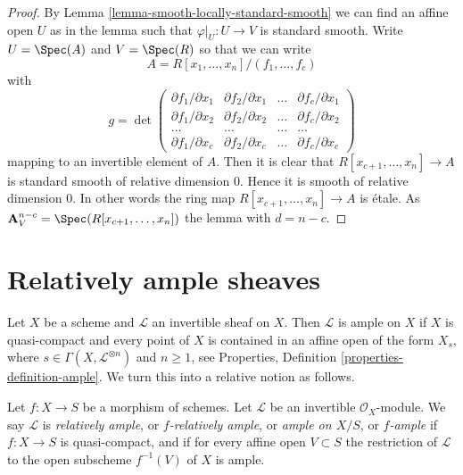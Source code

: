 \begin{proof}
By
Lemma \ref{lemma-smooth-locally-standard-smooth}
we can find an affine open $U$ as in the lemma such that
$\varphi|_U : U \to V$ is standard smooth. Write
$U = \Spec(A)$ and $V = \Spec(R)$ so that we can write
$$
A = R[x_1, \ldots, x_n]/(f_1, \ldots, f_c)
$$
with
$$
g =
\det
\left(
\begin{matrix}
\partial f_1/\partial x_1 &
\partial f_2/\partial x_1 &
\ldots &
\partial f_c/\partial x_1 \\
\partial f_1/\partial x_2 &
\partial f_2/\partial x_2 &
\ldots &
\partial f_c/\partial x_2 \\
\ldots & \ldots & \ldots & \ldots \\
\partial f_1/\partial x_c &
\partial f_2/\partial x_c &
\ldots &
\partial f_c/\partial x_c
\end{matrix}
\right)
$$
mapping to an invertible element of $A$. Then it is clear that
$R[x_{c + 1}, \ldots, x_n] \to A$ is standard smooth of relative
dimension $0$. Hence it is smooth of relative dimension $0$.
In other words the ring map $R[x_{c + 1}, \ldots, x_n] \to A$
is \'etale. As $\mathbf{A}^{n - c}_V = \Spec(R[x_{c + 1}, \ldots, x_n])$
the lemma with $d = n - c$.
\end{proof}
















\section{Relatively ample sheaves}
\label{section-relatively-ample}

\noindent
Let $X$ be a scheme and $\mathcal{L}$ an invertible sheaf on $X$.
Then $\mathcal{L}$ is ample on $X$ if $X$ is quasi-compact and
every point of $X$ is contained in an affine open of the form
$X_s$, where $s \in \Gamma(X, \mathcal{L}^{\otimes n})$ and $n \geq 1$, see
Properties, Definition \ref{properties-definition-ample}.
We turn this into a relative notion as follows.

\begin{definition}
\label{definition-relatively-ample}
Let $f : X \to S$ be a morphism of schemes.
Let $\mathcal{L}$ be an invertible $\mathcal{O}_X$-module.
We say $\mathcal{L}$ is {\it relatively ample}, or {\it $f$-relatively ample},
or {\it ample on $X/S$}, or {\it $f$-ample} if $f : X \to S$
is quasi-compact, and if for every affine open $V \subset S$
the restriction of $\mathcal{L}$ to the open subscheme
$f^{-1}(V)$ of $X$ is ample.
\end{definition}

